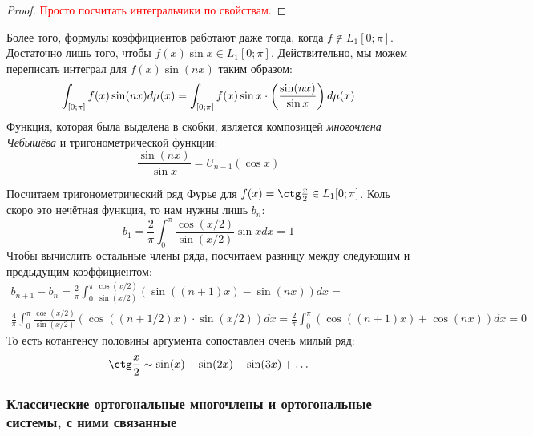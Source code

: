 \begin{proof}
	\textcolor{red}{Просто посчитать интегральчики по свойствам.}
\end{proof}

\begin{note}
	Более того, формулы коэффициентов работают даже тогда, когда $f \notin L_1[0; \pi]$. Достаточно лишь того, чтобы $f(x)\sin x \in L_1[0; \pi]$. Действительно, мы можем переписать интеграл для $f(x)\sin(nx)$ таким образом:
	\[
		\int_{[0; \pi]} f(x)\sin(nx)d\mu(x) = \int_{[0; \pi]} f(x)\sin x \cdot \left(\frac{\sin(nx)}{\sin x}\right)d\mu(x)
	\]
	Функция, которая была выделена в скобки, является композицей \textit{многочлена Чебышёва} и тригонометрической функции:
	\[
		\frac{\sin(nx)}{\sin x} = U_{n - 1}(\cos x)
	\]
\end{note}

\begin{example}
	Посчитаем тригонометрический ряд Фурье для $f(x) = \ctg \frac{x}{2} \in L_1[0; \pi]$. Коль скоро это нечётная функция, то нам нужны лишь $b_n$:
	\[
		b_1 = \frac{2}{\pi} \int_0^\pi \frac{\cos(x / 2)}{\sin(x / 2)} \sin xdx = 1
	\]
	Чтобы вычислить остальные члены ряда, посчитаем разницу между следующим и предыдущим коэффициентом:
	\begin{multline*}
		b_{n + 1} - b_n = \frac{2}{\pi} \int_0^\pi \frac{\cos(x / 2)}{\sin(x / 2)}(\sin((n + 1)x) - \sin(nx))dx =
		\\
		\frac{4}{\pi}\int_0^\pi \frac{\cos(x / 2)}{\sin(x / 2)}(\cos((n + 1/2)x) \cdot \sin(x / 2))dx = \frac{2}{\pi}\int_0^\pi (\cos((n + 1)x) + \cos(nx))dx = 0
	\end{multline*}
	То есть котангенсу половины аргумента сопоставлен очень милый ряд:
	\[
		\ctg \frac{x}{2} \sim \sin(x) + \sin(2x) + \sin(3x) + \ldots
	\]
\end{example}

\subsubsection*{Классические ортогональные многочлены и ортогональные системы, с ними связанные}

